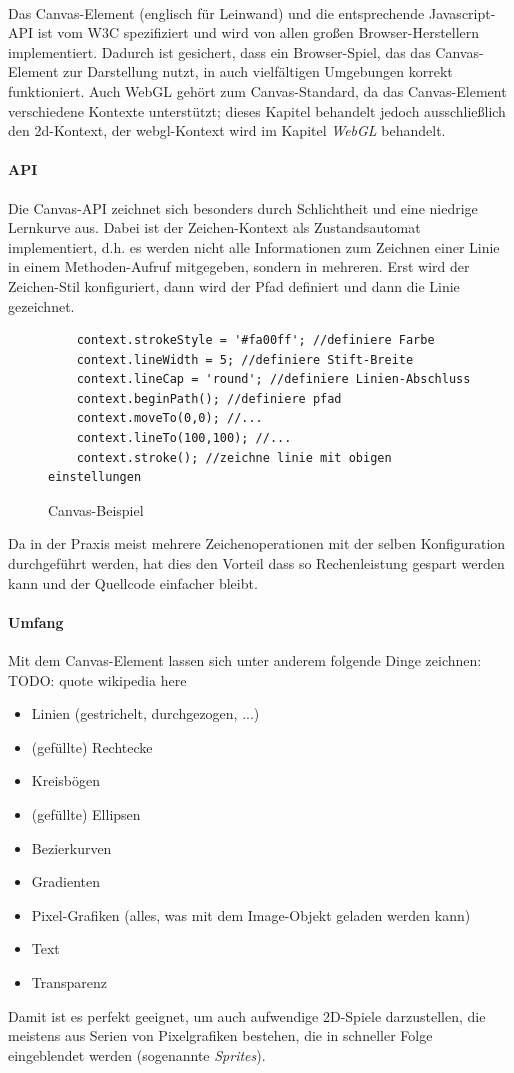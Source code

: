 \documentclass[a4paper, 12pt]{article}
\begin{document}
\paragraph{} Das Canvas-Element (englisch für Leinwand) und die entsprechende Javascript-API ist vom W3C spezifiziert und wird von allen großen Browser-Herstellern implementiert. Dadurch ist gesichert, dass ein Browser-Spiel, das das Canvas-Element zur Darstellung nutzt, in auch vielfältigen  Umgebungen korrekt funktioniert. Auch WebGL gehört zum Canvas-Standard, da das Canvas-Element verschiedene Kontexte unterstützt; dieses Kapitel behandelt jedoch ausschließlich den \glqq 2d\grqq-Kontext, der \glqq webgl\grqq-Kontext wird im Kapitel \emph{WebGL} behandelt.
\paragraph{API} Die Canvas-API zeichnet sich besonders durch Schlichtheit und eine niedrige Lernkurve aus. Dabei ist der Zeichen-Kontext als Zustandsautomat implementiert, d.h. es werden nicht alle Informationen zum Zeichnen einer Linie in einem Methoden-Aufruf mitgegeben, sondern in mehreren. Erst wird der Zeichen-Stil konfiguriert, dann wird der Pfad definiert und dann die Linie gezeichnet.
\begin{figure}[h!]
	\begin{verbatim}
	context.strokeStyle = '#fa00ff'; //definiere Farbe
	context.lineWidth = 5; //definiere Stift-Breite
	context.lineCap = 'round'; //definiere Linien-Abschluss
	context.beginPath(); //definiere pfad
	context.moveTo(0,0); //...
	context.lineTo(100,100); //...
	context.stroke(); //zeichne linie mit obigen einstellungen
	\end{verbatim}
	\caption{Canvas-Beispiel}
	\label{canvas-example}
\end{figure}
Da in der Praxis meist mehrere Zeichenoperationen mit der selben Konfiguration durchgeführt werden, hat dies den Vorteil dass so Rechenleistung gespart werden kann und der Quellcode einfacher bleibt.
\paragraph{Umfang} Mit dem Canvas-Element lassen sich unter anderem folgende Dinge zeichnen:
TODO: quote wikipedia here
\begin{itemize}
	\item Linien (gestrichelt, durchgezogen, ...)
	\item (gefüllte) Rechtecke
	\item Kreisbögen
	\item (gefüllte) Ellipsen
	\item Bezierkurven
	\item Gradienten
	\item Pixel-Grafiken (alles, was mit dem Image-Objekt geladen werden kann)
	\item Text
	\item Transparenz
\end{itemize}
Damit ist es perfekt geeignet, um auch aufwendige 2D-Spiele darzustellen, die meistens aus Serien von Pixelgrafiken bestehen, die in schneller Folge eingeblendet werden (sogenannte \emph{Sprites}).
\end{document}
